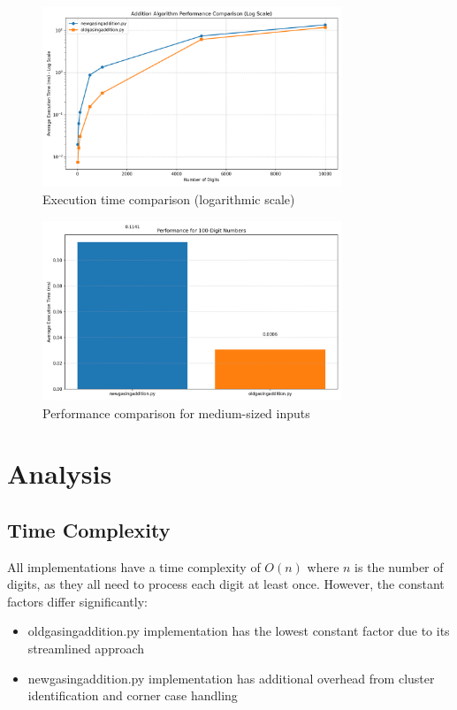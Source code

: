 \documentclass{article}
\begin{document}
\begin{figure}[H]
    \centering
    \includegraphics[width=0.8\textwidth]{performance_comparison_log.png}
    \caption{Execution time comparison (logarithmic scale)}
    \label{fig:perf_comparison_log}
\end{figure}

\begin{figure}[H]
    \centering
    \includegraphics[width=0.8\textwidth]{medium_size_comparison.png}
    \caption{Performance comparison for medium-sized inputs}
    \label{fig:medium_comparison}
\end{figure}

\section{Analysis}

\subsection{Time Complexity}
All implementations have a time complexity of $O(n)$ where $n$ is the number of digits, as they all need to process each digit at least once. However, the constant factors differ significantly:

\begin{itemize}
    \item oldgasingaddition.py implementation has the lowest constant factor due to its streamlined approach
    \item newgasingaddition.py implementation has additional overhead from cluster identification and corner case handling
\end{itemize}
\end{document}
